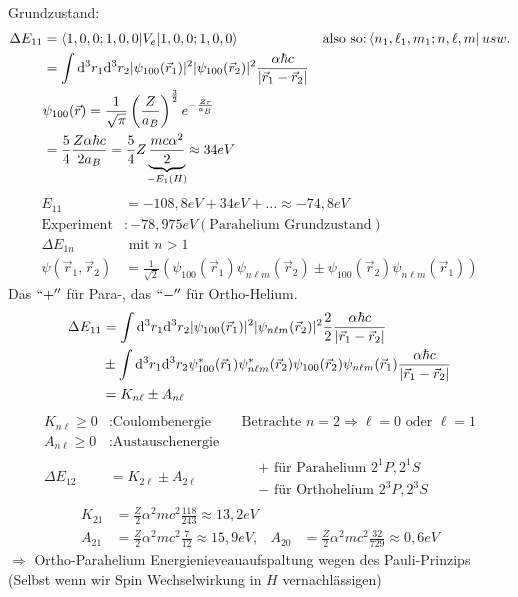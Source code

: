 Grundzustand:
	\begin{align*}
		\Delta E_{11} &=
		\braket{ 1, 0, 0 ; 1, 0, 0| V_e | 1, 0 , 0; 1, 0 ,0 } & 
		&\text{also so:}\bra{n_1, \ell_1, m_1; n , \ell, m} usw.\\
		&= \int \diff^3r_1 \diff^3r_2 |\psi_{100} (\vec{r}_1)|^2 |\psi_{100}(\vec{r}_2)|^2
		\frac{\alpha \hbar c}{|\vec{r}_1 - \vec{r}_2|} \\
		&\psi_{100} (\vec{r}) = \frac{1}{\sqrt{\pi}} 
		\left(\frac{Z}{a_B}\right)^{\frac{3}{2}} e^{-\frac{Zr}{a_B}}\\
		&= \frac{5}{4} \frac{Z \alpha \hbar c}{2 a_B} 
		= \frac{5}{4} Z \underbrace{\frac{mc\alpha^2}{2}}_{\mathclap{-E_1(H)}} 
		\approx 34 eV
	\end{align*}
	\begin{align*}
		E_{11} &= -108,8 eV + 34 eV + \ldots \approx - 74,8 eV \\
		\text{Experiment} &: -78,975eV (\text{Parahelium Grundzustand}) \\
		\Delta E_{1n} &\text{ mit } n>1 \\
		\psi (\vec{r}_1, \vec{r}_2) 
		&= \frac{1}{\sqrt{2}}
		\left( \psi_{100}(\vec{r}_1) \psi_{n \ell m}(\vec{r}_2) 
		\pm \psi_{100}(\vec{r}_2) \psi_{n \ell m} (\vec{r}_1) \right)
	\end{align*}
Das $``+''$ für Para-, das $``-''$ für Ortho-Helium.
	\begin{align*}
		\Delta E_{11} &=
		\int \mathrm{d}^3 r_1 \mathrm{d}^3 r_2 |\psi_{100} (\vec{r}_1)|^2 |\psi_{n \ell m} (\vec{r}_2)|^2
		\frac{2}{2} \frac{\alpha \hbar c}{|\vec{r}_1 - \vec{r}_2|} \\
		&\pm \int \mathrm{d}^3 r_1 \mathrm{d}^3 r_2 \psi_{100}^* (\vec{r}_1) \psi_{n \ell m}^* (\vec{r}_2)
		\psi_{100} (\vec{r}_2) \psi_{n \ell m} (\vec{r}_1)
		\frac{\alpha \hbar c}{|\vec{r}_1 - \vec{r}_2|} \\
		&= K_{n \ell} \pm A_{n \ell}
	\end{align*}
	\begin{align*}
		K_{n \ell} \geq 0 &: \text{Coulombenergie} & 
		&\text{Betrachte } n=2 \Rightarrow \ell = 0 \text{ oder } \ell = 1\\
		A_{n \ell} \geq 0 &: \text{Austauschenergie} \\
		\Delta E_{12} &= K_{2 \ell} \pm A_{2 \ell} &
		&\begin{aligned}
			&+ \text{ für Parahelium } 2^1 P, 2^1 S \\
			&- \text{ für Orthohelium } 2^3 P, 2^3 S
		\end{aligned}
	\end{align*}
	\begin{align*}
		K_{21} &= \frac{Z}{2} \alpha^2 m c^2 \frac{118}{243} \approx 13,2 eV \\
		A_{21} &= \frac{Z}{2} \alpha^2 m c^2 \frac{7}{12} \approx 15,9 eV
		,& A_{20} &= \frac{Z}{2} \alpha^2 m c^2 \frac{32}{729} \approx 0,6 eV
	\end{align*}
$\Rightarrow$ Ortho-Parahelium Energienieveauaufspaltung wegen des Pauli-Prinzips (Selbst wenn wir Spin Wechselwirkung in $H$ vernachlässigen) 


